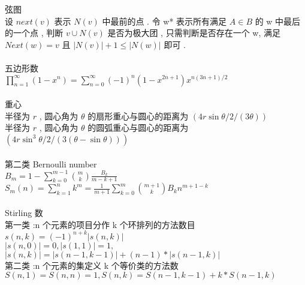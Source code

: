 弦图 \\
设 $next(v)$ 表示 $N(v)$ 中最前的点 . 
令 w* 表示所有满足 $A \in B$ 的 w 中最后的一个点 , 
判断 $v \cup N(v)$ 是否为极大团 , 
只需判断是否存在一个 w, 
满足 $Next(w)=v$ 且 $|N(v)| + 1 \leq |N(w)|$ 即可 . 
\\
\\
五边形数 \\
$
    \prod_{n=1}^{\infty}{(1-x^{n})}=\sum_{n=0}^{\infty}{(-1)^{n}(1-x^{2n+1})x^{n(3n+1)/2}}
$
\\
\\
重心 \\
半径为 $r$ , 圆心角为 $\theta$ 的扇形重心与圆心的距离为 $(4r\sin{\theta / 2} / (3\theta))$ \\
半径为 $r$ , 圆心角为 $\theta$ 的圆弧重心与圆心的距离为 $(4r\sin^3{\theta / 2} / (3(\theta-\sin{\theta})))$ \\
\\
第二类 Bernoulli number \\
$
    B_m = 1 - \sum_{k=0}^{m-1}{\binom{m}{k}\frac{B_{k}}{m-k+1}}$ \\
    $S_m(n) = \sum_{k=1}^{n}{k^{m}} = \frac{1}{m+1}\sum_{k=0}^{m}{\binom{m+1}{k}B_{k}n^{m+1-k}}
$
\\
\\
Stirling 数 \\
第一类 :n 个元素的项目分作 k 个环排列的方法数目\\
$
    s(n, k) = (-1)^{n+k}|s(n, k)|
    $\\
    $
    |s(n, 0)|=0, |s(1, 1)|=1,
    $\\
    $
    |s(n, k)|=|s(n-1, k-1)|+(n-1)*|s(n-1, k)|
$
\\
第二类 :n 个元素的集定义 k 个等价类的方法数\\
$
    S(n,1)=S(n,n)=1,
    S(n,k)=S(n-1,k-1)+k*S(n-1,k)
$
